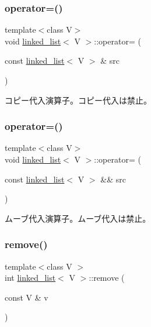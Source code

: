 \subsubsection{\texorpdfstring{operator=()}{operator=()}\hspace{0.1cm}{\footnotesize\ttfamily [1/2]}}
{\footnotesize\ttfamily template$<$class V$>$ \\
void \hyperlink{classlinked__list}{linked\+\_\+list}$<$ V $>$\+::operator= (\begin{DoxyParamCaption}\item[{const \hyperlink{classlinked__list}{linked\+\_\+list}$<$ V $>$ \&}]{src }\end{DoxyParamCaption})\hspace{0.3cm}{\ttfamily [delete]}}

コピー代入演算子。コピー代入は禁止。 \hypertarget{classlinked__list_a76ecccef113b75399c1243a6dc1763c4}{}\label{classlinked__list_a76ecccef113b75399c1243a6dc1763c4} 
\subsubsection{\texorpdfstring{operator=()}{operator=()}\hspace{0.1cm}{\footnotesize\ttfamily [2/2]}}
{\footnotesize\ttfamily template$<$class V$>$ \\
void \hyperlink{classlinked__list}{linked\+\_\+list}$<$ V $>$\+::operator= (\begin{DoxyParamCaption}\item[{const \hyperlink{classlinked__list}{linked\+\_\+list}$<$ V $>$ \&\&}]{src }\end{DoxyParamCaption})\hspace{0.3cm}{\ttfamily [delete]}}

ムーブ代入演算子。ムーブ代入は禁止。 \hypertarget{classlinked__list_a449bb389d8a0562078effe8a5cbce4ed}{}\label{classlinked__list_a449bb389d8a0562078effe8a5cbce4ed} 
\subsubsection{\texorpdfstring{remove()}{remove()}}
{\footnotesize\ttfamily template$<$class V $>$ \\
int \hyperlink{classlinked__list}{linked\+\_\+list}$<$ V $>$\+::remove (\begin{DoxyParamCaption}\item[{const V \&}]{v }\end{DoxyParamCaption})}

